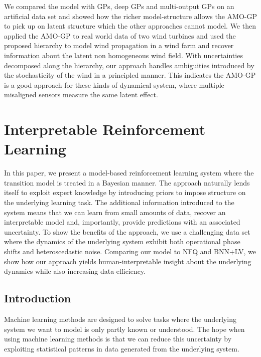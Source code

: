 We compared the model with GPs, deep GPs and multi-output GPs on an artificial data set and showed how the richer model-structure allows the AMO-GP to pick up on latent structure which the other approaches cannot model.
We then applied the AMO-GP to real world data of two wind turbines and used the proposed hierarchy to model wind propagation in a wind farm and recover information about the latent non homogeneous wind field.
With uncertainties decomposed along the hierarchy, our approach handles ambiguities introduced by the stochasticity of the wind in a principled manner.
This indicates the AMO-GP is a good approach for these kinds of dynamical system, where multiple misaligned sensors measure the same latent effect.


\section{Interpretable Reinforcement Learning}
\label{sec:interpretable_reinforcement_learning}
In this paper, we present a model-based reinforcement learning system where the transition model is treated in a Bayesian manner.
The approach naturally lends itself to exploit expert knowledge by introducing priors to impose structure on the underlying learning task.
The additional information introduced to the system means that we can learn from small amounts of data, recover an interpretable model and, importantly, provide predictions with an associated uncertainty.
To show the benefits of the approach, we use a challenging data set where the dynamics of the underlying system exhibit both operational phase shifts and heteroscedastic noise.
Comparing our model to NFQ and BNN+LV, we show how our approach yields human-interpretable insight about the underlying dynamics while also increasing data-efficiency.


\subsection{Introduction}
\label{sub:interpretable_reinforcement_learning:introduction}
Machine learning methods \parencite{shalev-shwartz_understanding_2014} are designed to solve tasks where the underlying system we want to model is only partly known or understood.
The hope when using machine learning methods is that we can reduce this uncertainty by exploiting statistical patterns in data generated from the underlying system.


